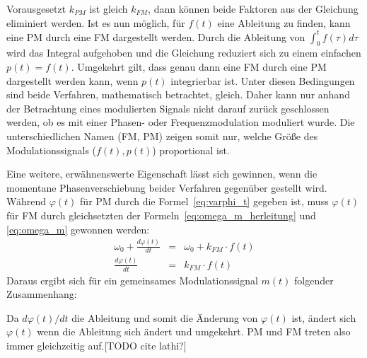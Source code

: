 Vorausgesetzt \(k_{PM}\) ist gleich \(k_{FM}\), dann können beide Faktoren aus der Gleichung eliminiert werden. Ist es nun möglich, für \(f(t)\) eine Ableitung zu finden, kann eine PM durch eine FM dargestellt werden. Durch die Ableitung von \(\int_0^t{f(\tau)}d\tau\) wird das Integral aufgehoben und die Gleichung reduziert sich zu einem einfachen \(p(t)=f(t)\). Umgekehrt gilt, dass genau dann eine FM durch eine PM dargestellt werden kann, wenn \(p(t)\) integrierbar ist. Unter diesen Bedingungen sind beide Verfahren, mathematisch betrachtet, gleich. Daher kann nur anhand der Betrachtung eines modulierten Signals nicht darauf zurück geschlossen werden, ob es mit einer Phasen- oder Frequenzmodulation moduliert wurde. Die unterschiedlichen Namen (FM, PM) zeigen somit nur, welche Größe des Modulationssignals (\(f(t), p(t)\)) proportional ist. \cite[S. 210]{lathi}

Eine weitere, erwähnenswerte Eigenschaft lässt sich gewinnen, wenn die momentane Phasenverschiebung beider Verfahren gegenüber gestellt wird. Während \(\varphi(t)\) für PM durch die Formel~\ref{eq:varphi_t} gegeben ist, muss \(\varphi(t)\) für FM durch gleichsetzten der Formeln~\ref{eq:omega_m_herleitung} und \ref{eq:omega_m} gewonnen werden:
\begin{eqnarray*}
\omega_0+\frac{d\varphi(t)}{dt}&=&\omega_0+k_{FM}\cdot f(t) \\
\frac{d\varphi(t)}{dt}&=&k_{FM}\cdot f(t)
\end{eqnarray*}
Daraus ergibt sich für ein gemeinsames Modulationssignal \(m(t)\) folgender Zusammenhang:
\begin{center}
\end{center}
Da \({d\varphi(t)}/{dt}\) die Ableitung und somit die Änderung von \(\varphi(t)\) ist, ändert sich \(\varphi(t)\) wenn die Ableitung sich ändert und umgekehrt. PM und FM treten also immer gleichzeitig auf.[TODO cite lathi?]

